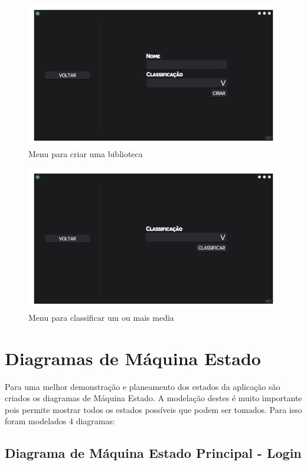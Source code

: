 \documentclass[a4paper]{report}
\begin{document}
\begin{figure}[H]
	\centering 
    \includegraphics[width=\textwidth]{images/Criar_Biblioteca_Menu.png}  
    \caption{Menu para criar uma biblioteca}
\end{figure}

\begin{figure}[H]
	\centering 
    \includegraphics[width=\textwidth]{images/Classificar_Menu.png}  
    \caption{Menu para classificar um ou mais media}
\end{figure}

\chapter{Diagramas de Máquina Estado}

Para uma melhor demonstração e planeamento dos estados da aplicação são criados os
diagramas de Máquina Estado. A modelação destes é muito importante pois permite
mostrar todos os estados possíveis que podem ser tomados. Para isso foram modelados
4 diagramas:

\section{Diagrama de Máquina Estado Principal - Login}
\end{document}

